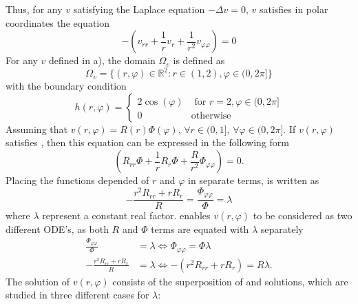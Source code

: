 Thus, for any $v$ satisfying the Laplace equation $-\Delta v = 0$, $v$ satisfies in polar coordinates the equation
\begin{equation}
	\label{eq:laplacePolar}
	-\left(v_{rr} + \frac{1}{r} v_r + \frac{1}{r^2} v_{\varphi\varphi}\right)=0
\end{equation}
%
For any $v$ defined in a), the domain $\Omega_v$ is defined as
\begin{equation}
	\Omega_v = \{(r,\varphi) \in \mathbb{R}^2 \colon r \in (1,2), \varphi \in (0, 2\pi]\}
\end{equation}
with the boundary condition 
\begin{equation}
	\label{eq:boundaryPolar}
	h(r, \varphi) =
	\begin{cases}
		2\cos{(\varphi)} &\text{ for } r = 2,  \varphi \in (0, 2\pi] \\
		0 &\text{otherwise}
	\end{cases}
\end{equation}
%
\newcommand{\constFac}{\lambda}
Assuming that $v(r,\varphi) = R(r)\Phi(\varphi) \text{, } \forall r \in (0,1] \text{, } \forall \varphi \in (0,2\pi]$.
If $v(r,\varphi)$ satisfies , then this equation can be expressed in the following form
\begin{equation}
	\label{eq:laplaceSep}
	\left(R_{rr} \Phi + \frac{1}{r} R_r \Phi + \frac{R}{r^2} \Phi_{\varphi\varphi}\right) = 0
	\text{.}
\end{equation}
Placing the functions depended of $r$ and $\varphi$ in separate terms,  is written as
\begin{equation}
	\label{eq:laplaceSep2}
	-\frac{r^2 R_{rr} + r R_r}{R} = \frac{\Phi_{\varphi\varphi}}{\Phi} = \constFac
\end{equation}
where $\constFac$ represent a constant real factor.
 enables $v(r,\varphi)$ to be considered as two different ODE's, as both $R$ and $\Phi$ terms are equated with $\constFac$ separately
%
\begin{align}
	\label{eq:odePhi}
	\frac{\Phi_{\varphi\varphi}}{\Phi} &= \constFac \iff    \Phi_{\varphi\varphi} = \Phi \constFac \\ 
	\label{eq:odeR}
	-\frac{r^2 R_{rr} + r R_r}{R} &= \constFac      \iff   -\left(r^2 R_{rr} + r R_r \right) = R \constFac
	\text{.}
\end{align}
%
The solution of $v(r,\varphi)$ consists of the superposition of  and  solutions, which are studied in three different cases for $\lambda$:

